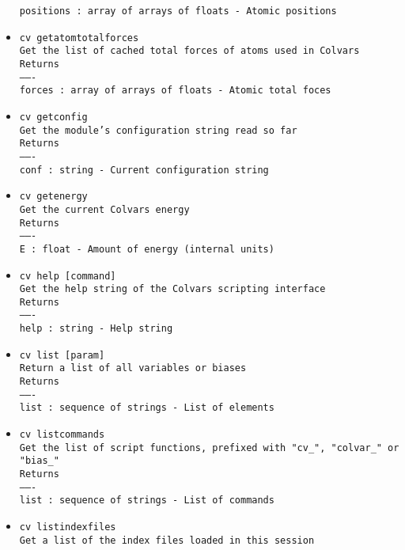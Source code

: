 \begin{itemize}
\texttt{positions : array of arrays of floats - Atomic positions}
\item \texttt{cv getatomtotalforces}
\\
\texttt{Get the list of cached total forces of atoms used in Colvars}
\\
\texttt{Returns}
\\
\texttt{-------}
\\
\texttt{forces : array of arrays of floats - Atomic total foces}
\item \texttt{cv getconfig}
\\
\texttt{Get the module's configuration string read so far}
\\
\texttt{Returns}
\\
\texttt{-------}
\\
\texttt{conf : string - Current configuration string}
\item \texttt{cv getenergy}
\\
\texttt{Get the current Colvars energy}
\\
\texttt{Returns}
\\
\texttt{-------}
\\
\texttt{E : float - Amount of energy (internal units)}
\item \texttt{cv help [command]}
\\
\texttt{Get the help string of the Colvars scripting interface}
\\
\texttt{Returns}
\\
\texttt{-------}
\\
\texttt{help : string - Help string}
\item \texttt{cv list [param]}
\\
\texttt{Return a list of all variables or biases}
\\
\texttt{Returns}
\\
\texttt{-------}
\\
\texttt{list : sequence of strings - List of elements}
\item \texttt{cv listcommands}
\\
\texttt{Get the list of script functions, prefixed with "cv\_", "colvar\_" or "bias\_"}
\\
\texttt{Returns}
\\
\texttt{-------}
\\
\texttt{list : sequence of strings - List of commands}
\item \texttt{cv listindexfiles}
\\
\texttt{Get a list of the index files loaded in this session}

\end{itemize}
